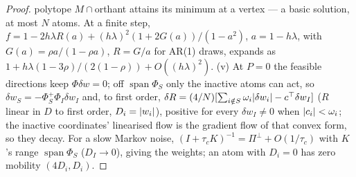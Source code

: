 \begin{proof}
polytope $M\cap{}$orthant attains its minimum at a vertex --- a basic solution, at most $N$ atoms. At a finite step,
$f = 1 - 2h\lambda R(a) + (h\lambda)^2(1 + 2G(a))/(1 - a^2)$, $a = 1 - h\lambda$, with $G(a) = \rho a/(1 - \rho a)$,
$R = G/a$ for AR(1) draws, expands as $1 + h\lambda(1 - 3\rho)/(2(1 - \rho)) + O((h\lambda)^2)$. (v) At $P = 0$ the
feasible directions keep $\Phi\delta w = 0$; off $\operatorname{span}\Phi_S$ only the inactive atoms can act, so
$\delta w_S = -\Phi_S^+\Phi_I\delta w_I$ and, to first order,
$\delta R = (4/N)[\sum_{i\notin S}\omega_i\lvert \delta w_i\rvert - c^\top\delta w_I]$ ($R$ linear in $D$ to first order,
$D_i = \lvert w_i\rvert$), positive for every $\delta w_I\ne0$ when $\lvert c_i\rvert < \omega_i$; the inactive coordinates' linearised
flow is the gradient flow of that convex form, so they decay. For a slow Markov noise,
$(I + \tau_cK)^{-1} = \Pi^\perp + O(1/\tau_c)$ with $K$'s range $\operatorname{span}\Phi_S$ ($D_I\to0$), giving the
weights; an atom with $D_i = 0$ has zero mobility $(4D_i,D_i)$.
\end{proof}
